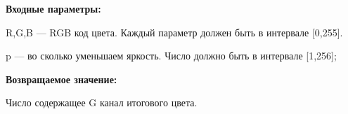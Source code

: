 \textbf{Входные параметры:}  

R,G,B --- RGB код цвета. Каждый параметр должен быть в интервале [0,255].

p --- во сколько уменьшаем яркость. Число должно быть в интервале [1,256];

\textbf{Возвращаемое значение:}

Число содержащее G канал итогового цвета.